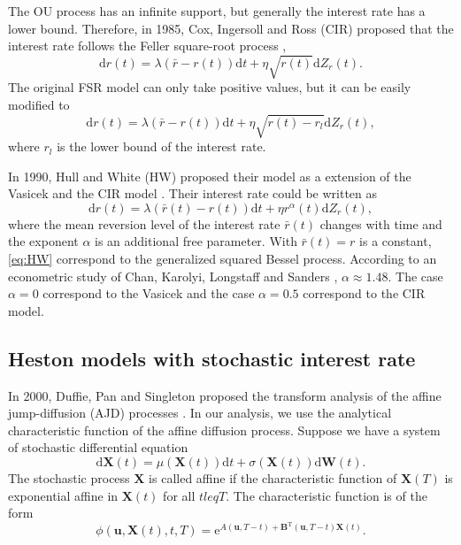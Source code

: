 \documentclass[12pt]{report}
\begin{document}
The OU process has an infinite support, but generally the interest rate has a lower bound. Therefore, in 1985, Cox, Ingersoll and Ross (CIR) \cite{cox1985Theory} proposed that the interest rate follows the Feller square-root process \cite{feller1951two},
\begin{equation}
\mathrm{d} r(t)=\lambda(\bar{r}-r(t)) \mathrm{d} t+\eta \sqrt{r(t)} \mathrm{d} Z_r(t).
\end{equation}
The original FSR model can only take positive values, but it can be easily modified to  
\begin{equation}
\mathrm{d} r(t)=\lambda(\bar{r}-r(t)) \mathrm{d} t+\eta \sqrt{r(t)-r_l} \mathrm{d} Z_r(t),
\end{equation}
where $r_l $ is the lower bound of the interest rate.

In 1990, Hull and White (HW) \cite{hull1990pricing} proposed their model as a extension of the Vasicek and the CIR model . Their interest rate could be written as 
\begin{equation}\label{eq:HW}
    \mathrm{d} r(t) = \lambda\left(\bar{r}(t)-r(t)\right) \mathrm{d} t+\eta r^{\alpha}(t) \mathrm{d} Z_r(t),
\end{equation}
where the mean reversion level of the interest rate $\bar{r}(t)$ changes with time and the exponent $\alpha$ is an additional free parameter. With $\bar{r}(t) = r$ is a constant, \ref{eq:HW} correspond to the generalized squared Bessel process. According to an econometric study of Chan, Karolyi, Longstaff and Sanders \cite{chan1992empirical}, $\alpha \approx 1.48$. The case $\alpha = 0$ correspond to the Vasicek and the case $\alpha = 0.5$ correspond to the CIR model. 

\subsection{Heston models with stochastic interest rate}
In 2000, Duffie, Pan and Singleton proposed the transform analysis of the affine jump-diffusion (AJD) processes \cite{duffie2000transform}. In our analysis, we use the analytical characteristic function of the affine diffusion process. Suppose we have a system of stochastic differential equation
\begin{equation}
\mathrm{d} \mathbf{X}(t)=\mu(\mathbf{X}(t)) \mathrm{d} t+\sigma(\mathbf{X}(t)) \mathrm{d} \mathbf{W}(t).
\end{equation}
The stochastic process $\mathbf{X}$ is called affine if the characteristic function of $\mathbf{X}(T)$ is exponential affine in $\mathbf{X}(t)$ for all $t leq T$. The characteristic function is of the form
\begin{equation}
\phi(\mathbf{u}, \mathbf{X}(t), t, T)=\mathrm{e}^{A(\mathbf{u}, T-t)+\mathbf{B}^{\mathrm{T}}(\mathbf{u}, T-t) \mathbf{X}(t)}.
\end{equation}
\end{document}
